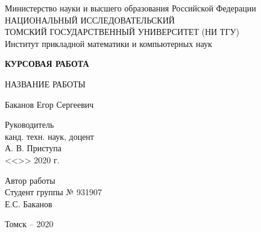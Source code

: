﻿\begin{titlepage}
    \begin{center}
        Министерство науки и высшего образования Российской Федерации \\
        НАЦИОНАЛЬНЫЙ ИССЛЕДОВАТЕЛЬСКИЙ \\
        ТОМСКИЙ ГОСУДАРСТВЕННЫЙ УНИВЕРСИТЕТ (НИ ТГУ) \\
        Институт прикладной математики и компьютерных наук 
        \par
        \vspace{6cm}
        {\bf
            КУРСОВАЯ РАБОТА
            \par
        }
        НАЗВАНИЕ РАБОТЫ
        \par
        Баканов Егор Сергеевич 
        \par
        \vspace{4cm}
        \hfill
        \begin{minipage}{5cm}
            Руководитель \\
            канд. техн. наук, доцент \\
            А. В. Приступа \\
            <<\underline{\hspace{.8cm}}>>
            \underline{\hspace{1.6cm}}
            2020 г.
            \par
            Автор работы \\
            Студент группы № 931907 \\
            Е.С. Баканов
            \par
        \end{minipage}
        \vfill
        {\normalsize
            Томск -- 2020
            \par
        }
    \end{center}
\end{titlepage}